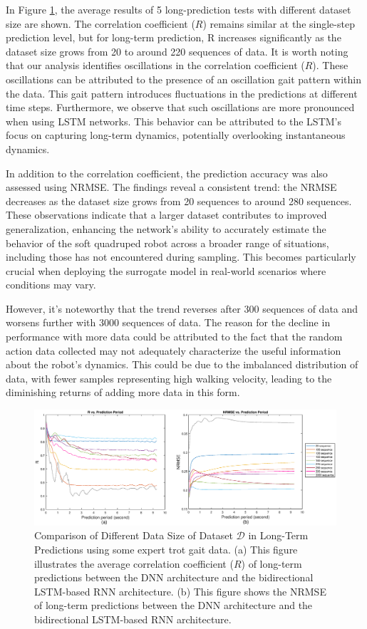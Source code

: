 In Figure \ref{fig:datasize}, the average results of 5 long-prediction tests with different dataset size are shown. The correlation coefficient ($R$) remains similar at the single-step prediction level, but for long-term prediction, R increases significantly as the dataset size grows from 20 to around 220 sequences of data. It is worth noting that our analysis identifies oscillations in the correlation coefficient ($R$). These oscillations can be attributed to the presence of an oscillation gait pattern within the data. This gait pattern introduces fluctuations in the predictions at different time steps. Furthermore, we observe that such oscillations are more pronounced when using LSTM networks. This behavior can be attributed to the LSTM's focus on capturing long-term dynamics, potentially overlooking instantaneous dynamics.

In addition to the correlation coefficient, the prediction accuracy was also assessed using \ac{NRMSE}. The findings reveal a consistent trend: the NRMSE decreases as the dataset size grows from 20 sequences to around 280 sequences. These observations indicate that a larger dataset contributes to improved generalization, enhancing the network's ability to accurately estimate the behavior of the soft quadruped robot across a broader range of situations, including those has not encountered during sampling. This becomes particularly crucial when deploying the surrogate model in real-world scenarios where conditions may vary.

However, it's noteworthy that the trend reverses after 300 sequences of data and worsens further with 3000 sequences of data. The reason for the decline in performance with more data could be attributed to the fact that the random action data collected may not adequately characterize the useful information about the robot's dynamics. This could be due to the imbalanced distribution of data, with fewer samples representing high walking velocity, leading to the diminishing returns of adding more data in this form.
\begin{figure}[htb]
    \centering
    \includegraphics[width=\linewidth]{img/chap4/datasize.eps}
    \caption{Comparison of Different Data Size of Dataset $\mathcal{D}$ in Long-Term Predictions using some expert trot gait data. (a) This figure illustrates the average correlation coefficient ($R$) of long-term predictions between the DNN architecture and the bidirectional LSTM-based RNN architecture. (b) This figure shows the \ac{NRMSE} of long-term predictions between the DNN architecture and the bidirectional LSTM-based RNN architecture.}
    \label{fig:datasize}
\end{figure}

